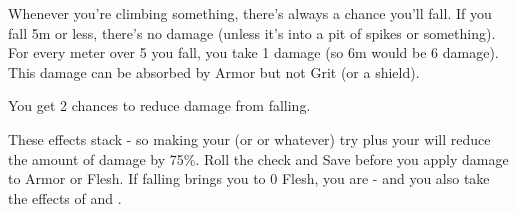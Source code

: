 \cbreak


  Whenever you're climbing something, there's always a chance you'll fall. If you fall 5m or less, there's no damage (unless it's into a pit of spikes or something). For every meter over 5 you fall, you take 1 damage (so 6m would be 6 damage).  This damage can be absorbed by Armor but not Grit (or a shield).  

  You get 2 chances to reduce damage from falling.


  These effects stack - so making your \VIG (or \DEX or whatever) try plus your  will reduce the amount of damage by 75\%.  Roll the check and Save before you apply damage to Armor or Flesh.  If falling brings you to 0 Flesh, you are  - and you also take the effects of  and .

